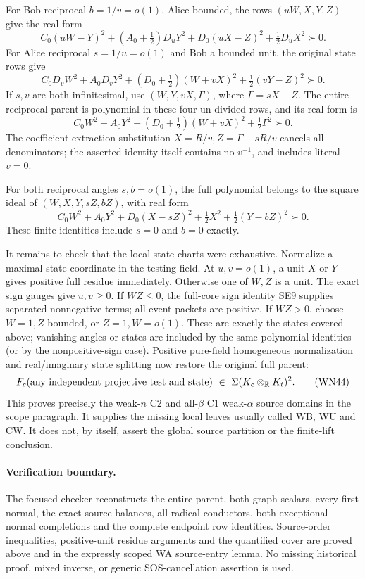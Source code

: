 For Bob reciprocal \(b=1/v=o(1)\), Alice bounded, the rows
\((uW,X,Y,Z)\) give the real form
\[
 C_0(uW-Y)^2+(A_0+\tfrac12)D_uY^2+
                 D_0(uX-Z)^2+\tfrac12D_uX^2\succ0.
 \tag{WN41}
\]
For Alice reciprocal \(s=1/u=o(1)\) and Bob a bounded unit,
the original state rows give
\[
 C_0D_vW^2+A_0D_vY^2+
       (D_0+\tfrac12)(W+vX)^2+\tfrac12(vY-Z)^2\succ0.
\]
If \(s,v\) are both infinitesimal, use
\((W,Y,vX,\Gamma)\), where \(\Gamma=sX+Z\).
The entire reciprocal parent is polynomial in these four
un-divided rows, and its real form is
\[
 C_0W^2+A_0Y^2+
                 (D_0+\tfrac12)(W+vX)^2+\tfrac12\Gamma^2\succ0.
 \tag{WN42}
\]
The coefficient-extraction substitution \(X=R/v,Z=\Gamma-sR/v\)
cancels all denominators; the asserted identity itself contains
no \(v^{-1}\), and includes literal \(v=0\).

For both reciprocal angles \(s,b=o(1)\), the full polynomial
belongs to the square ideal of \((W,X,Y,sZ,bZ)\), with real form
\[
 C_0W^2+A_0Y^2+D_0(X-sZ)^2+
                    \tfrac12X^2+\tfrac12(Y-bZ)^2\succ0.
 \tag{WN43}
\]
These finite identities include \(s=0\) and \(b=0\) exactly.

It remains to check that the local state charts were exhaustive.
Normalize a maximal state coordinate in the testing field.
At \(u,v=o(1)\), a unit \(X\) or \(Y\) gives positive full
residue immediately. Otherwise one of \(W,Z\) is a unit.
The exact sign gauges give \(u,v\geq0\).
If \(WZ\leq0\), the full-core sign identity SE9 supplies
separated nonnegative terms; all event packets are positive.
If \(WZ>0\), choose \(W=1,Z\) bounded, or \(Z=1,W=o(1)\).
These are exactly the states covered above; vanishing angles
or states are included by the same polynomial identities
(or by the nonpositive-sign case).
Positive pure-field homogeneous normalization and real/imaginary
state splitting now restore the original full parent:
\[
 F_c(\hbox{any independent projective test and state})
       \ \in\ \Sigma(K_c\otimes_{\mathbb R}K_t)^2 .
 \tag{WN44}
\]
This proves precisely the weak-\(n\) C2 and all-\(\beta\) C1
weak-\(\alpha\) source domains in the scope paragraph.
It supplies the missing local leaves usually called WB, WU
and CW. It does not, by itself, assert the global source
partition or the finite-lift conclusion.

\paragraph{Verification boundary.}
The focused checker reconstructs the entire parent, both graph
scalars, every first normal, the exact source balances, all
radical conductors, both exceptional normal completions and the
complete endpoint row identities. Source-order inequalities,
positive-unit residue arguments and the quantified cover are
proved above and in the expressly scoped WA source-entry lemma.
No missing historical proof, mixed inverse, or generic
SOS-cancellation assertion is used.

